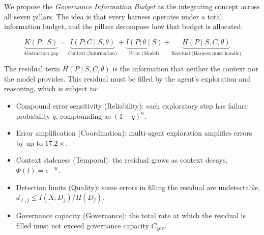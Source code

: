 \documentclass[11pt, a4paper, logo, copyright]{googledeepmind}
\begin{document}
We propose the \emph{Governance Information Budget} as the integrating concept across all seven pillars. The idea is that every harness operates under a total information budget, and the pillars decompose how that budget is allocated:

\begin{equation}
\label{eq:gib}
    \underbrace{K(P \mid S)}_{\text{Abstraction gap}} = \underbrace{I(P; C \mid S, \theta)}_{\text{Context (Information)}} + \underbrace{I(P; \theta \mid S)}_{\text{Prior (Model)}} + \underbrace{H(P \mid S, C, \theta)}_{\text{Residual (Harness must handle)}}
\end{equation}

The residual term $H(P \mid S, C, \theta)$ is the information that neither the context nor the model provides. This residual must be filled by the agent's exploration and reasoning, which is subject to:
\begin{itemize}[nosep]
    \item Compound error sensitivity (Reliability): each exploratory step has failure probability $q$, compounding as $(1-q)^n$.
    \item Error amplification (Coordination): multi-agent exploration amplifies errors by up to $17.2\times$.
    \item Context staleness (Temporal): the residual grows as context decays, $\Phi(t) = e^{-\Lambda t}$.
    \item Detection limits (Quality): some errors in filling the residual are undetectable, $d_{\ell,j} \leq I(X; D_j)/H(D_j)$.
    \item Governance capacity (Governance): the total rate at which the residual is filled must not exceed governance capacity $C_{\text{gov}}$.
\end{itemize}
\end{document}
